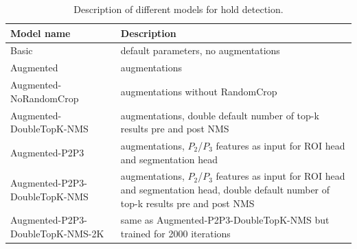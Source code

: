 \documentclass[final]{cvpr}
\begin{document}
\begin{table}[t!]  %
    \centering
    \begin{tabular}{lp{11cm}} %
           \toprule
         Model name & Description  \\\midrule
         Basic & default parameters, no augmentations \\
         Augmented & augmentations \\
         Augmented-NoRandomCrop & augmentations without RandomCrop \\
         Augmented-DoubleTopK-NMS & augmentations, double default number of top-k results pre and post NMS \\
         Augmented-P2P3 & augmentations, $P_2$/$P_3$ features as input for ROI head and segmentation head\\
         Augmented-P2P3-DoubleTopK-NMS & augmentations, $P_2$/$P_3$ features as input for ROI head and segmentation head,  double default number of top-k results pre and post NMS\\
         Augmented-P2P3-DoubleTopK-NMS-2K & same as Augmented-P2P3-DoubleTopK-NMS but trained for 2000 iterations\\ \bottomrule
         
    \end{tabular}
    \caption{Description of different models for hold detection.}
    \label{tab:model_descriptions}
\end{table}
\end{document}

